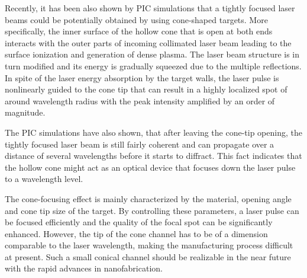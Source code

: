 Recently, it has been also shown by PIC simulations that a tightly focused laser beams could be potentially obtained by using cone-shaped targets. More specifically, the inner surface of the hollow cone that is open at both ends interacts with the outer parts of incoming collimated laser beam leading to the surface ionization and generation of dense plasma. The laser beam structure is in turn modified and its energy is gradually squeezed due to the multiple reflections. In spite of the laser energy absorption by the target walls, the laser pulse is nonlinearly guided to the cone tip that can result in a highly localized spot of around wavelength radius with the peak intensity amplified by an order of magnitude.

The PIC simulations have also shown, that after leaving the cone-tip opening, the tightly focused laser beam is still fairly coherent and can propagate over a distance of several wavelengths before it starts to diffract. This fact indicates that the hollow cone might act as an optical device that focuses down the laser pulse to a wavelength level.

The cone-focusing effect is mainly characterized by the material, opening angle and cone tip size of the target. By controlling these parameters, a laser pulse can be focused efficiently and the quality of the focal spot can be significantly enhanced. However, the tip of the cone channel has to be of a dimension comparable to the laser wavelength, making the manufacturing process difficult at present. Such a small conical channel should be realizable in the near future with the rapid advances in nanofabrication.